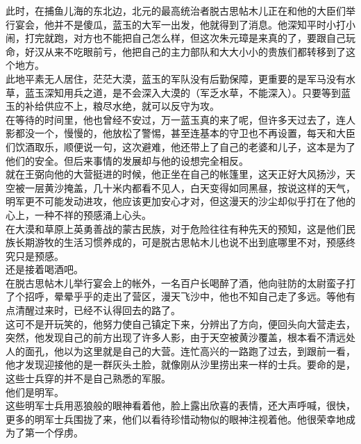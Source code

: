 \begin{multicols}{\theparacolNo}
此时，在捕鱼儿海的东北边，北元的最高统治者脱古思帖木儿正在和他的大臣们举行宴会，他并不是傻瓜，蓝玉的大军一出发，他就得到了消息。他深知平时小打小闹，打完就跑，对方也不能把自己怎么样，但这次朱元璋是来真的了，要跟自己玩命，好汉从来不吃眼前亏，他把自己的主力部队和大大小小的贵族们都转移到了这个地方。\\

此地平素无人居住，茫茫大漠，蓝玉的军队没有后勤保障，更重要的是军马没有水草，蓝玉深知用兵之道，是不会深入大漠的（军乏水草，不能深入）。只要等到蓝玉的补给供应不上，粮尽水绝，就可以反守为攻。\\

在等待的时间里，他也曾经不安过，万一蓝玉真的来了呢，但许多天过去了，连人影都没一个，慢慢的，他放松了警惕，甚至连基本的守卫也不再设置，每天和大臣们饮酒取乐，顺便说一句，这次避难，他还带上了自己的老婆和儿子，这本是为了他们的安全。但后来事情的发展却与他的设想完全相反。\\

就在王弼向他的大营挺进的时候，他正坐在自己的帐篷里，这天正好大风扬沙，天空被一层黄沙掩盖，几十米内都看不见人，白天变得如同黑昼，按说这样的天气，明军更不可能发动进攻，他应该更加安心才对，但这漫天的沙尘却似乎打在了他的心上，一种不祥的预感涌上心头。\\

在大漠和草原上英勇善战的蒙古民族，对于危险往往有种先天的预知，这是他们民族长期游牧的生活习惯养成的，可是脱古思帖木儿也说不出到底哪里不对，预感终究只是预感。\\

还是接着喝酒吧。\\

在脱古思帖木儿举行宴会上的帐外，一名百户长喝醉了酒，他向驻防的太尉蛮子打了个招呼，晕晕乎乎的走出了营区，漫天飞沙中，他也不知自己走了多远。等他有点清醒过来时，已经不认得回去的路了。\\

这可不是开玩笑的，他努力使自己镇定下来，分辨出了方向，便回头向大营走去，突然，他发现自己的前方出现了许多人影，由于天空被黄沙覆盖，根本看不清远处人的面孔，他以为这里就是自己的大营。连忙高兴的一路跑了过去，到跟前一看，他才发现迎接他的是一群灰头土脸，就像刚从沙里捞出来一样的士兵。要命的是，这些士兵穿的并不是自己熟悉的军服。\\

他们是明军。\\

这些明军士兵用恶狼般的眼神看着他，脸上露出欣喜的表情，还大声呼喊，很快，更多的明军士兵围拢了来，他们以看待珍惜动物似的眼神注视着他。他很荣幸地成为了第一个俘虏。\\


\end{multicols}

